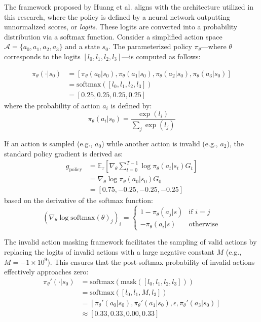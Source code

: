 \documentclass[a4paper]{scrartcl}
\begin{document}
The framework proposed by Huang et al. \cite{DBLP:journals/corr/abs-2006-14171} aligns with the architecture utilized in this research, where the policy is defined by a neural network outputting unnormalized scores, or \textit{logits}. These logits are converted into a probability distribution via a softmax function. Consider a simplified action space $\mathcal{A} = \{a_0, a_1, a_2, a_3\}$ and a state $s_0$. The parameterized policy $\pi_{\theta}$—where $\theta$ corresponds to the logits $[l_0, l_1, l_2, l_3]$—is computed as follows:

\begin{align}
\pi_{\theta}(\cdot|s_{0}) &= [\pi_{\theta}(a_{0}|s_{0}), \pi_{\theta}(a_{1}|s_{0}), \pi_{\theta}(a_{2}|s_{0}), \pi_{\theta}(a_{3}|s_{0})] \nonumber \\
&= \text{softmax}([l_{0}, l_{1}, l_{2}, l_{3}])\nonumber \\
&= [0.25, 0.25, 0.25, 0.25]
\end{align}
where the probability of action $a_i$ is defined by:
\begin{equation}
\pi_{\theta}(a_{i}|s_{0}) = \frac{\exp(l_{i})}{\sum_{j} \exp(l_{j})}
\end{equation}

If an action is sampled (e.g., $a_0$) while another action is invalid (e.g., $a_2$), the standard policy gradient is derived as:
\begin{align}
g_{\text{policy}} &= \mathbb{E}_{\tau} \left[ \nabla_{\theta} \sum_{t=0}^{T-1} \log \pi_{\theta}(a_t|s_t) G_t \right] \nonumber \\
&= \nabla_{\theta} \log \pi_{\theta}(a_0|s_0) G_0 \nonumber \\
&= [0.75, -0.25, -0.25, -0.25]
\end{align}
based on the derivative of the softmax function:
\begin{equation}
(\nabla_{\theta} \log \text{softmax}(\theta)_j)_i = 
\begin{cases} 
1 - \pi_{\theta}(a_j|s) & \text{if } i = j \\ 
-\pi_{\theta}(a_i|s) & \text{otherwise} 
\end{cases}
\end{equation}

The invalid action masking framework facilitates the sampling of valid actions by replacing the logits of invalid actions with a large negative constant $M$ (e.g., $M = -1 \times 10^{9}$). This ensures that the post-softmax probability of invalid actions effectively approaches zero:
\begin{align}
\pi_{\theta}'(\cdot|s_{0}) &= \text{softmax}(\text{mask}([l_{0}, l_{1}, l_{2}, l_{3}])) \nonumber \\
&= \text{softmax}([l_{0}, l_{1}, M, l_{3}]) \nonumber \\
&= [\pi_{\theta}'(a_{0}|s_{0}), \pi_{\theta}'(a_{1}|s_{0}), \epsilon, \pi_{\theta}'(a_{3}|s_{0})] \nonumber \\
&\approx [0.33, 0.33, 0.00, 0.33]
\end{align}
\end{document}
